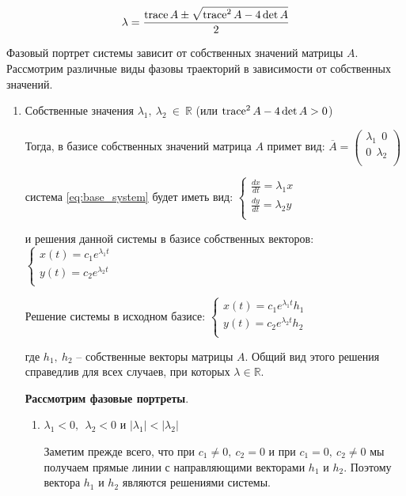\documentclass[a4paper, 12pt]{article}
\begin{document}
    \[ \lambda = \frac{\operatorname{trace} A \pm \sqrt{\operatorname{trace}^2 A - 4 \det A}}{2} \]

    Фазовый портрет системы зависит от собственных значений матрицы $A$. Рассмотрим различные виды фазовы траекторий в зависимости от собственных значений.

    \begin{enumerate}
      \item Собственные значения  $\lambda_1, ~ \lambda_2 ~ \in ~ \mathbb{R}$ (или $\operatorname{trace}^2 A - 4 \det A > 0$)
      
      Тогда, в базисе собственных значений матрица $A$ примет вид:
      $\overline{A} = 
      \begin{pmatrix}
        \lambda_1 ~~ 0 \\
        0 ~~ \lambda_2 \\
      \end{pmatrix}$

      система \eqref{eq:base_system} будет иметь вид:
      $\begin{cases}
        \frac{d x}{d t} = \lambda_1 x \\
        \frac{d y}{d t} = \lambda_2 y \\        
      \end{cases}$

      и решения данной системы в базисе собственных векторов:
      $\begin{cases}
        x(t) = c_1 e^{\lambda_1 t} \\
        y(t) = c_2 e^{\lambda_2 t} \\
      \end{cases}$

      Решение системы в исходном базисе:
      $\begin{cases}
        x(t) = c_1 e^{\lambda_1 t} h_1 \\
        y(t) = c_2 e^{\lambda_2 t} h_2 \\
      \end{cases}$

      где $h_1, ~ h_2$ -- собственные векторы матрицы $A$. Общий вид этого решения справедлив для всех случаев, при которых $\lambda \in \mathbb{R}$.

      \textbf{Рассмотрим фазовые портреты}.

      \begin{enumerate}
        \item $\lambda_1 < 0, ~~ \lambda_2 < 0$ и $|\lambda_1| < |\lambda_2|$
        
        Заметим прежде всего, что при $c_1 \neq 0, ~ c_2 = 0$ и при $c_1 = 0, ~ c_2 \neq 0$ мы получаем прямые линии с направляющими векторами $h_1$ и $h_2$. Поэтому вектора $h_1$ и $h_2$ являются решениями системы.


\end{enumerate}
\end{enumerate}
\end{document}

